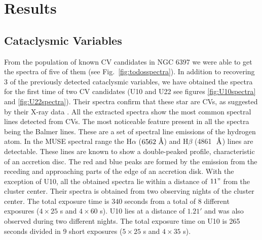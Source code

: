 \chapter{Results}\label{chap:results}
\thispagestyle{fancy}

\section{Cataclysmic Variables }
From the population of known CV candidates in NGC 6397 we were able to get the spectra of five of them (see Fig.~\ref{fig:todosspectra}). In addition to recovering 3 of the previously detected cataclysmic variables, we have obtained the spectra for the first time of two CV candidates (U10 and U22 see figures \ref{fig:U10spectra} and \ref{fig:U22spectra}). Their spectra confirm that these star are CVs, as suggested by their X-ray data \citep{grindlay_chandra_2001}. All the extracted spectra show the most common spectral lines detected from CVs. The most noticeable feature present in all the spectra being the Balmer lines. These are a set of spectral line emissions of the hydrogen atom. In the MUSE spectral range the H$\alpha$ ($6562 \text{ \r A}$) and H$\beta$ (4861 $\text{ \r A}$) lines are detectable. These lines are known to show a double-peaked profile, characteristic of an accretion disc. The red and blue peaks are formed by the emission from the receding and approaching parts of the edge of an accretion disk. With the exception of U10, all the obtained spectra lie within a distance of $11"$ from the cluster center. Their spectra is obtained from two observing nights of the cluster center. The total exposure time is 340 seconds from a total of 8 different exposures ($4 \times 25$ s and $4 \times 60$ s). U10 lies at a distance of $1.21'$ and was also observed during two different nights. The total exposure time on U10 is 265 seconds divided in 9 short exposures ($5 \times 25$ s and $4 \times 35$ s).

